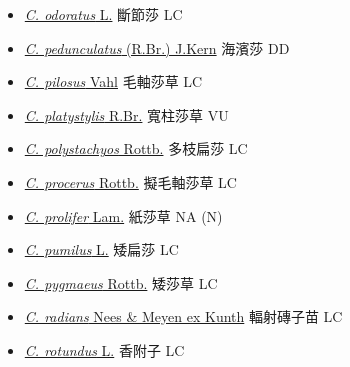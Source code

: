\begin{itemize}
\begin{itemize}
        \item[] \href{http://www.theplantlist.org/tpl1.1/search?q=Cyperus+odoratus}{\textit{C. odoratus} L.}   斷節莎   LC
        \item[] \href{http://www.theplantlist.org/tpl1.1/search?q=Cyperus+pedunculatus}{\textit{C. pedunculatus} (R.Br.) J.Kern}   海濱莎   DD
        \item[] \href{http://www.theplantlist.org/tpl1.1/search?q=Cyperus+pilosus}{\textit{C. pilosus} Vahl}   毛軸莎草   LC
        \item[] \href{http://www.theplantlist.org/tpl1.1/search?q=Cyperus+platystylis}{\textit{C. platystylis} R.Br.}   寬柱莎草   VU
        \item[] \href{http://www.theplantlist.org/tpl1.1/search?q=Cyperus+polystachyos}{\textit{C. polystachyos} Rottb.}   多枝扁莎   LC
        \item[] \href{http://www.theplantlist.org/tpl1.1/search?q=Cyperus+procerus}{\textit{C. procerus} Rottb.}   擬毛軸莎草   LC
        \item[] \href{http://www.theplantlist.org/tpl1.1/search?q=Cyperus+prolifer}{\textit{C. prolifer} Lam.}   紙莎草   NA (N)
        \item[] \href{http://www.theplantlist.org/tpl1.1/search?q=Cyperus+pumilus}{\textit{C. pumilus} L.}   矮扁莎   LC
        \item[] \href{http://www.theplantlist.org/tpl1.1/search?q=Cyperus+pygmaeus}{\textit{C. pygmaeus} Rottb.}   矮莎草   LC
        \item[] \href{http://www.theplantlist.org/tpl1.1/search?q=Cyperus+radians}{\textit{C. radians} Nees \& Meyen ex Kunth}   輻射磚子苗   LC
        \item[] \href{http://www.theplantlist.org/tpl1.1/search?q=Cyperus+rotundus}{\textit{C. rotundus} L.}   香附子   LC

\end{itemize}
\end{itemize}
